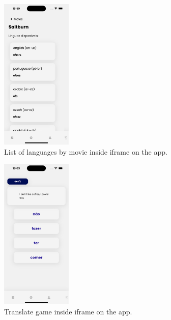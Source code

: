 \documentclass[12pt]{article}
\begin{document}
  \begin{figure}[h]
    \centering
    \caption{
     List of languages by movie inside iframe on the app.
    }
    \label{fig:app5}
    \includegraphics[width=0.3\textwidth]{assets/18.png}
  \end{figure}

  \begin{figure}[h]
    \centering
    \caption{
     Translate game inside iframe on the app.
    }
    \label{fig:app6}
    \includegraphics[width=0.3\textwidth]{assets/19.png}
  \end{figure}
\end{document}
